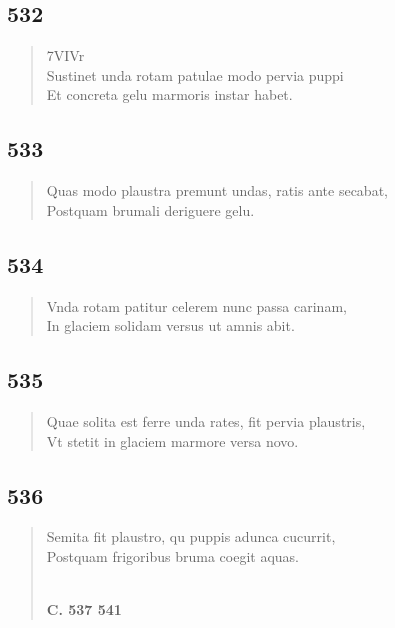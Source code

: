 \documentclass[11pt, a4paper]{report}
\begin{document}
            \subsection*{532}
      \begin{verse}
      7VIVr \\ Sustinet unda rotam patulae modo pervia puppi \\ Et concreta gelu marmoris instar habet. \\ 
      \end{verse}
  
            \subsection*{533}
      \begin{verse}
      Quas modo plaustra premunt undas, ratis ante secabat, \\ Postquam brumali deriguere gelu. \\ 
      \end{verse}
  
            \subsection*{534}
      \begin{verse}
      Vnda rotam patitur celerem nunc passa carinam, \\ In glaciem solidam versus ut amnis abit. \\ 
      \end{verse}
  
            \subsection*{535}
      \begin{verse}
      Quae solita est ferre unda rates, fit pervia plaustris, \\ Vt stetit in glaciem marmore versa novo. \\ 
      \end{verse}
  
            \subsection*{536}
      \begin{verse}
      Semita fit plaustro, qu puppis adunca cucurrit, \\ Postquam frigoribus bruma coegit aquas. \\ 
        ﻿\pagebreak 
    \begin{center} \textbf{C. 537 541} \end{center} \marginpar{[68]} 
      \end{verse}
  
\end{document}
